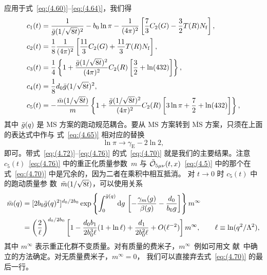 应用于式~\eqref{eq:(4.60)}--\eqref{eq:(4.64)}，我们得
\begin{align}
   c_1(t)&
   =\frac{1}{\Bar{g}(1/\sqrt{8t})^2}
   -b_0\ln\pi-\frac{1}{(4\pi)^2}
   \left[\frac{7}{3}C_2(G)
   -\frac{3}{2}T(R)N_{\mathrm{f}}\right],
\label{eq:(4.72)}\\
   c_2(t)&
   =\frac{1}{8}
   \frac{1}{(4\pi)^2}
   \left[\frac{11}{3}C_2(G)
   +\frac{11}{3}T(R)N_{\mathrm{f}}\right],
\label{eq:(4.73)}\\
   c_3(t)&
   =\frac{1}{4}\left\{1+\frac{\Bar{g}(1/\sqrt{8t})^2}{(4\pi)^2}C_2(R)
   \left[\frac{3}{2}+\ln(432)\right]\right\},
\label{eq:(4.74)}\\
   c_4(t)&=\frac{1}{8}d_0\Bar{g}(1/\sqrt{8t})^2,
\label{eq:(4.75)}\\
   c_5(t)&=-\frac{\Bar{m}(1/\sqrt{8t})}{m}
   \left\{1+\frac{\Bar{g}(1/\sqrt{8t})^2}{(4\pi)^2}C_2(R)
   \left[3\ln\pi+\frac{7}{2}+\ln(432)\right]\right\},
\label{eq:(4.76)}
\end{align}
其中 $\Bar{g}(q)$ 是 $\text{MS}$ 方案的跑动规范耦合。要从 $\text{MS}$
方案转到 $\overline{\text{MS}}$ 方案，只须在上面的表达式中作与
式~\eqref{eq:(4.65)} 相对应的替换
\begin{equation}
   \ln\pi\to\gamma_{\mathrm{E}}-2\ln2,
\label{eq:(4.77)}
\end{equation}
即可。带式~\eqref{eq:(4.72)}--\eqref{eq:(4.76)} 的式~\eqref{eq:(4.70)}
就是我们的主要结果。注意 $c_5(t)$~\eqref{eq:(4.76)}
中的重正化质量参数~$m$ 与 $\Tilde{\mathcal{O}}_{5\mu\nu}(t,x)$~\eqref{eq:(4.5)}
中的那个在式~\eqref{eq:(4.70)} 中是冗余的，因为二者在乘积中相互抵消。
对 $t\to0$ 时 $c_5(t)$ 中的跑动质量参
数~$\Bar{m}(1/\sqrt{8t})$，可以使用关系
\begin{align}
   \Bar{m}(q)&=[2b_0\Bar{g}(q)^2]^{d_0/2b_0}
   \exp\left\{\int_0^{\Bar{g}(q)}\mathrm{d}g\,
   \left[-\frac{\gamma_m(g)}{\beta(g)}-\frac{d_0}{b_0g}\right]\right\}m^\infty
\notag\\
   &=\left(\frac{2}{\ell}\right)^{d_0/2b_0}
   \left[1-\frac{d_0b_1}{2b_0^3\ell}(1+\ln\ell)+\frac{d_1}{2b_0^2\ell}
   +O(\ell^{-2})\right]m^\infty,\qquad\ell\equiv\ln(q^2/\Lambda^2),
\label{eq:(4.78)}
\end{align}
其中 $m^\infty$ 表示重正化群不变质量。对有质量的费米子，$m^\infty$~例如可用文
献~\cite{Capitani:1998mq}中确立的方法确定。对无质量费米子，$m^\infty=0$，
我们可以直接弃去式~\eqref{eq:(4.70)} 的最后一行。
